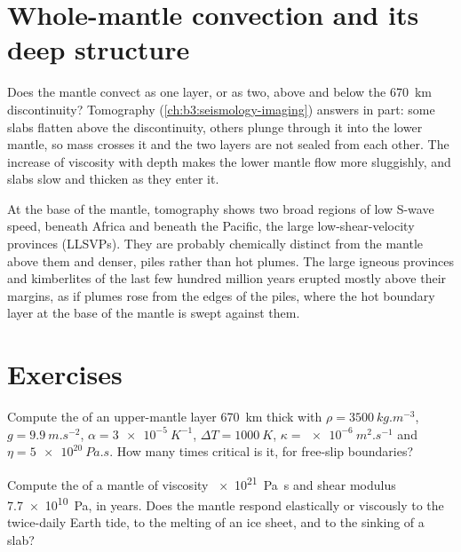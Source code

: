\section{Whole-mantle convection and its deep structure}

Does the mantle convect as one layer, or as two, above and below the
\qty{670}{km} discontinuity? Tomography (\cref{ch:b3:seismology-imaging})
answers in part: some slabs flatten above the discontinuity, others plunge
through it into the lower mantle, so mass crosses it and the two layers are not
sealed from each other. The increase of viscosity with depth makes the lower
mantle flow more sluggishly, and slabs slow and thicken as they enter it.

At the base of the mantle, tomography shows two broad regions of low S-wave
speed, beneath Africa and beneath the Pacific, the large low-shear-velocity
provinces (LLSVPs). They are probably chemically distinct from the mantle above
them and denser, piles rather than hot plumes. The large igneous provinces and
kimberlites of the last few hundred million years erupted mostly above their
margins, as if plumes rose from the edges of the piles, where the hot boundary
layer at the base of the mantle is swept against them.

\section{Exercises}

\begin{exercise}[$\star$]\label{exo:b3:mantle-convection:1}
Compute the  of an upper-mantle layer \qty{670}{km} thick with
$\rho = \qty{3500}{kg.m^{-3}}$, $g = \qty{9.9}{m.s^{-2}}$, $\alpha =
\qty{3e-5}{K^{-1}}$, $\Delta T = \qty{1000}{K}$, $\kappa =
\qty{e-6}{m^2.s^{-1}}$ and $\eta = \qty{5e20}{Pa.s}$. How many times critical is
it, for free-slip boundaries?
\end{exercise}

\begin{exercise}[$\star$]\label{exo:b3:mantle-convection:2}
Compute the  of a mantle of viscosity \qty{e21}{Pa.s} and shear
modulus \qty{7.7e10}{Pa}, in years. Does the mantle respond elastically or
viscously to the twice-daily Earth tide, to the melting of an ice sheet, and to
the sinking of a slab?
\end{exercise}

